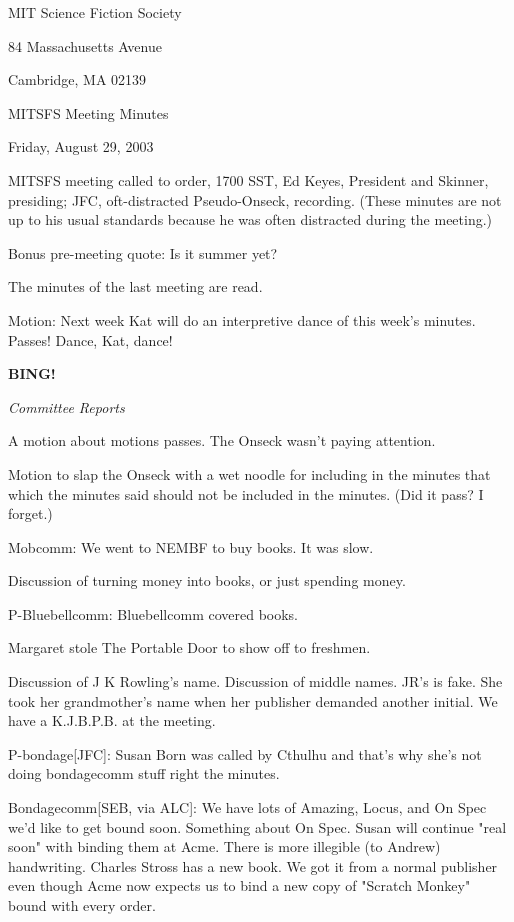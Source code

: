 \documentclass[12pt]{article}
\newcommand{\bing}{{\bf BING!} }
\newcommand{\goto}[1]{\bing \vskip 12pt \centerline{{\em{#1}}}}
\begin{document}
\begin{center}

MIT Science Fiction Society 

84 Massachusetts Avenue

Cambridge, MA 02139

\vspace{12pt}

MITSFS Meeting Minutes 

Friday, August 29, 2003

\end{center}
 
\vspace{18pt}

\setlength{\parskip}{6pt}

\noindent
MITSFS meeting called to order, 1700 SST, Ed Keyes, President and Skinner, presiding; JFC, oft-distracted Pseudo-Onseck, recording. (These minutes are not up to his usual standards because he was often distracted during the meeting.)

Bonus pre-meeting quote: Is it summer yet?

The minutes of the last meeting are read.

Motion: Next week Kat will do an interpretive dance of this week's minutes. Passes! Dance, Kat, dance!

\goto{Committee Reports}

A motion about motions passes.  The Onseck wasn't paying attention.

Motion to slap the Onseck with a wet noodle for including in the minutes that which the minutes said should not be included in the minutes. (Did it pass?  I forget.)

Mobcomm: We went to NEMBF to buy books. It was slow.

Discussion of turning money into books, or just spending money.

P-Bluebellcomm: Bluebellcomm covered books.

Margaret stole The Portable Door to show off to freshmen.

Discussion of J K Rowling's name. Discussion of middle names. JR's is fake. She took her grandmother's name when her publisher demanded another initial. We have a K.J.B.P.B. at the meeting.

P-bondage[JFC]: Susan Born was called by Cthulhu and that's why she's not doing bondagecomm stuff right the minutes.

Bondagecomm[SEB, via ALC]: We have lots of Amazing, Locus, and On Spec we'd like to get bound soon.  Something about On Spec. Susan will continue "real soon" with binding them at Acme. There is more illegible (to Andrew) handwriting. Charles Stross has a new book. We got it from a normal publisher even though Acme now expects us to bind a new copy of "Scratch Monkey" bound with every order.
\end{document}
